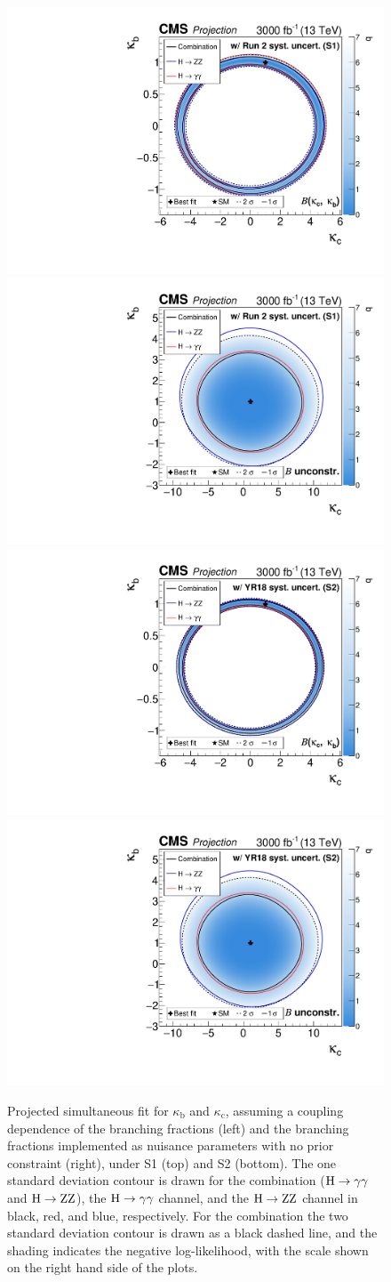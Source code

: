 \begin{figure}[hbtp]
\begin{center}
{        }{
        \includegraphics[width=0.49\linewidth]{img/projections/projection_kbkc_plot_couplingdependentBRs.pdf}
        \includegraphics[width=0.49\linewidth]{img/projections/projection_kbkc_plot_floatingBRs.pdf}
        \includegraphics[width=0.49\linewidth]{img/projections/projection_kbkc_plot_couplingdependentBRs_scenario2.pdf}
        \includegraphics[width=0.49\linewidth]{img/projections/projection_kbkc_plot_floatingBRs_scenario2.pdf}
        }
    \caption{
        Projected simultaneous fit for $\kappa_\textrm{b}$ and $\kappa_\textrm{c}$, assuming a coupling dependence of the branching fractions (left) and the branching fractions implemented as nuisance parameters with no prior constraint (right), under S1 (top) and S2 (bottom).
        The one standard deviation contour is drawn for the combination ($\mathrm{H}\to\mathrm{\gamma}\mathrm{\gamma}$ and $\mathrm{H}\to\mathrm{Z}\mathrm{Z}$), the $\mathrm{H}\to\mathrm{\gamma}\mathrm{\gamma}$ channel, and the $\mathrm{H}\to\mathrm{Z}\mathrm{Z}$ channel in black, red, and blue, respectively.
        For the combination the two standard deviation contour is drawn as a black dashed line, and the shading indicates the negative log-likelihood, with the scale shown on the right hand side of the plots.
        }
    \label{fig:proj_kbkc}
  \end{center}
\end{figure}



